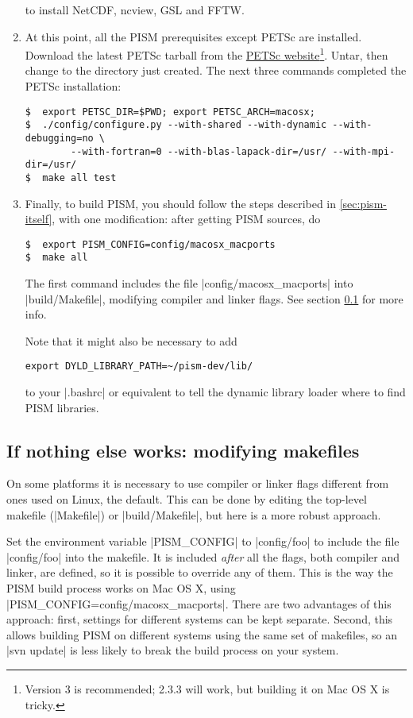 \documentclass[11pt,final]{amsart}
\begin{document}
\begin{enumerate}
to install NetCDF, ncview, GSL and FFTW.
\item At this point, all the PISM prerequisites except PETSc are installed. Download the latest PETSc tarball from the
  \href{http://www.mcs.anl.gov/petsc/petsc-as/}{PETSc website}\footnote{Version 3 is recommended; 2.3.3 will work, but building it on Mac OS X is tricky.}. Untar, then change to the directory just created.
The next three commands completed the PETSc installation:
\begin{verbatim}
$  export PETSC_DIR=$PWD; export PETSC_ARCH=macosx;
$  ./config/configure.py --with-shared --with-dynamic --with-debugging=no \
        --with-fortran=0 --with-blas-lapack-dir=/usr/ --with-mpi-dir=/usr/
$  make all test
\end{verbatim}
\item Finally, to build PISM, you should follow the steps described in \ref{sec:pism-itself}, with one modification: after getting
  PISM sources, do
\begin{verbatim}
$  export PISM_CONFIG=config/macosx_macports
$  make all
\end{verbatim}
  The first command includes the file |config/macosx_macports| into |build/Makefile|, modifying compiler and linker flags. See
  section \ref{subsec:config} for more info.

  Note that it might also be necessary to add
\begin{verbatim}
export DYLD_LIBRARY_PATH=~/pism-dev/lib/
\end{verbatim}
  to your |.bashrc| or equivalent to tell the dynamic library loader where to find PISM libraries.
\end{enumerate}


\clearpage
\subsection{If nothing else works: modifying makefiles}
\label{subsec:config}

On some platforms it is necessary to use compiler or linker flags different from ones used on
Linux, the default.  This can be done by editing the top-level makefile (|Makefile|) or |build/Makefile|, but here is a more robust approach.

Set the environment variable |PISM_CONFIG| to |config/foo| to include the file |config/foo| into the makefile.  It is included \emph{after} all the flags, both compiler and linker, are defined, so it is possible to override any of them.   This is the way the PISM build process works on Mac OS X, using |PISM_CONFIG=config/macosx_macports|.  There are two advantages of this approach: first, settings for different systems can be kept separate.  Second, this allows building PISM on different systems using the same set of makefiles, so an |svn update| is less likely to break the build process on your system.
\end{document}

